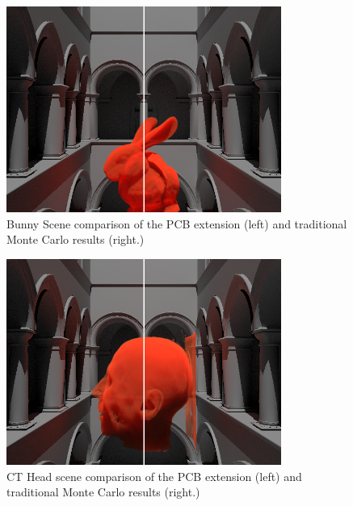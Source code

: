 \documentclass[runningheads]{llncs}
\begin{document}
\begin{figure}[]
    \centering
    \includegraphics[width=90mm]{img/compare.png}
    \caption{Bunny Scene comparison of the PCB extension (left) and traditional Monte Carlo results (right.)}
    \label{fig:compare1}
\end{figure}


\begin{figure}
    \centering
    \includegraphics[width=90mm]{img/compare_head.png}
    \caption{CT Head scene comparison of the PCB extension (left) and traditional Monte Carlo results (right.)}
    \label{fig:compare2}
\end{figure}
\end{document}
